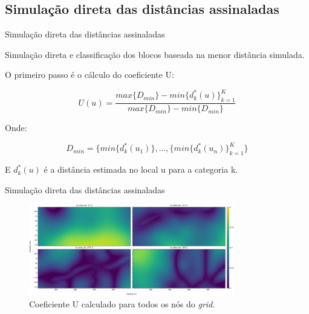 \documentclass[aspectratio=169]{beamer}
\begin{document}
\subsection{Simulação direta das distâncias assinaladas}

\begin{frame}{Simulação direta das distâncias assinaladas}

Simulação direta e classificação dos blocos baseada na menor distância simulada.

O primeiro passo é o cálculo do coeficiente U:

\begin{equation}\label{u_eq}
U(u)=\frac{max\{D_{min}\}-min\{d^*_k(u)\}^K_{k=1}}{max\{D_{min}\}-min\{D_{min}\}}
\end{equation}

Onde:

\begin{equation}
D_{min}=\{min\{d^*_k(u_1)\},...,\{min\{d^*_k(u_n)\}^K_{k=1}\}
\end{equation}

E $d^*_k(u)$ é a distância estimada no local u para a categoria k.


\end{frame}

\begin{frame}{Simulação direta das distâncias assinaladas}
	\begin{figure}[H]
		\caption{\label{u_fig}Coeficiente U calculado para todos os nós do \textit{grid}.}
		\begin{center}
			\includegraphics[width=0.8\textwidth]{capitulo_2/u_coef.png}
		\end{center}
	\end{figure}
\end{frame}
\end{document}

